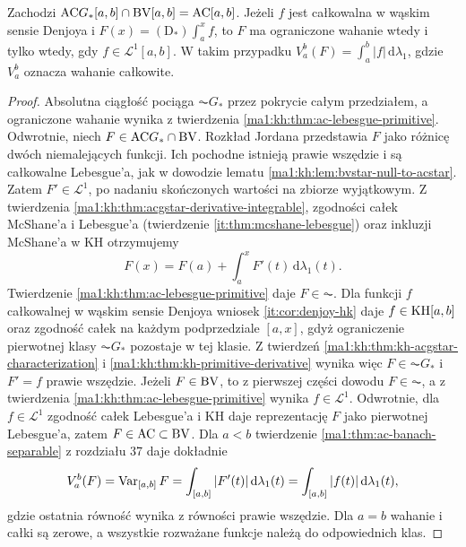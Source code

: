 \begin{twierdzenie}\label{it:thm:denjoy-bv-ac}
Zachodzi $\mathrm{AC} G_*[a,b]\cap\mathrm{BV}[a,b]=\mathrm{AC}[a,b]$.
Jeżeli $f$ jest całkowalna w wąskim sensie Denjoya i
$F(x)=(\mathrm D_*)\int_a^x f$, to $F$ ma ograniczone wahanie wtedy i tylko wtedy, gdy $f\in\mathcal L^1[a,b]$.
W takim przypadku $V_a^b(F)=\int_a^b|f|\,\mathrm d\lambda_1$, gdzie $V_a^b$ oznacza wahanie całkowite.
\end{twierdzenie}
\begin{proof}
Absolutna ciągłość pociąga $\AC G_*$ przez pokrycie całym przedziałem, a ograniczone wahanie wynika z twierdzenia \ref{ma1:kh:thm:ac-lebesgue-primitive}.
Odwrotnie, niech $F\in\mathrm{AC} G_*\cap\mathrm{BV}$. Rozkład Jordana przedstawia $F$ jako różnicę dwóch niemalejących funkcji. Ich pochodne istnieją prawie wszędzie i są całkowalne Lebesgue'a, jak w dowodzie lematu \ref{ma1:kh:lem:bvstar-null-to-acstar}. Zatem $F'\in\mathcal L^1$, po nadaniu skończonych wartości na zbiorze wyjątkowym.
Z twierdzenia \ref{ma1:kh:thm:acgstar-derivative-integrable}, zgodności całek McShane'a i Lebesgue'a (twierdzenie \ref{it:thm:mcshane-lebesgue}) oraz inkluzji McShane'a w KH otrzymujemy
\[
 F(x)=F(a)+\int_a^x F'(t)\,\mathrm d\lambda_1(t).
\]
Twierdzenie \ref{ma1:kh:thm:ac-lebesgue-primitive} daje $F\in\AC$.
Dla funkcji $f$ całkowalnej w wąskim sensie Denjoya
wniosek \ref{it:cor:denjoy-hk} daje $f\in\mathrm{KH}[a,b]$
oraz zgodność całek na każdym podprzedziale $[a,x]$,
gdyż ograniczenie pierwotnej klasy $\AC G_*$ pozostaje
w tej klasie. Z twierdzeń
\ref{ma1:kh:thm:kh-acgstar-characterization}
i \ref{ma1:kh:thm:kh-primitive-derivative}
wynika więc $F\in\AC G_*$ i $F'=f$ prawie wszędzie.
Jeżeli $F\in\mathrm{BV}$, to z pierwszej części dowodu
$F\in\AC$, a z twierdzenia
\ref{ma1:kh:thm:ac-lebesgue-primitive} wynika
$f\in\mathcal L^1$. Odwrotnie, dla $f\in\mathcal L^1$
zgodność całek Lebesgue'a i KH daje reprezentację
$F$ jako pierwotnej Lebesgue'a, zatem $F\in\mathrm{AC}\subset\mathrm{BV}$.
Dla $a<b$ twierdzenie \ref{ma1:thm:ac-banach-separable}
z rozdziału 37 daje dokładnie
\[
 V_a^b(F)=\operatorname{Var}_{[a,b]}F
 =\int_{[a,b]}|F'(t)|\,\mathrm d\lambda_1(t)
 =\int_{[a,b]}|f(t)|\,\mathrm d\lambda_1(t),
\]
gdzie ostatnia równość wynika z równości prawie wszędzie.
Dla $a=b$ wahanie i całki są zerowe, a wszystkie
rozważane funkcje należą do odpowiednich klas.
\end{proof}
\endgroup
